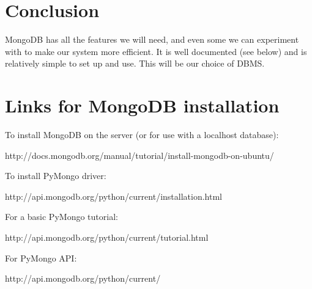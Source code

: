 \documentclass{article}
\begin{document}
\section{Conclusion}

MongoDB has all the features we will need, and even some we can experiment with to make our system more efficient. It is well documented (see below) and is relatively simple to set up and use. This will be our choice of DBMS.

\section{Links for MongoDB installation}

To install MongoDB on the server (or for use with a localhost database):

\noindent http://docs.mongodb.org/manual/tutorial/install-mongodb-on-ubuntu/

\noindent To install PyMongo driver:

\noindent http://api.mongodb.org/python/current/installation.html

\noindent For a basic PyMongo tutorial:

\noindent http://api.mongodb.org/python/current/tutorial.html

\noindent For PyMongo API:

\noindent http://api.mongodb.org/python/current/
\end{document}
